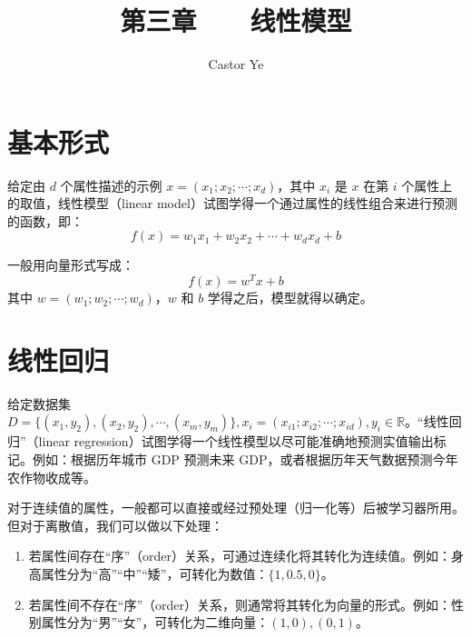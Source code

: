 \documentclass[12pt, a4paper]{article} %
\title{第三章 \ \ \ 线性模型} %
\author{Castor Ye} %
\date{} %
\begin{document}
\maketitle %
\newtheorem{definition}{定义}[section]
\newtheorem{theorem}{定理}[section]
\newtheorem{example}{例}[section]
\newtheorem{solution}{题解}
\newtheorem{algorithm}{算法}
\newtheorem{axiom}{公理}
\newtheorem{property}{性质}
\newtheorem{proposition}{命题}
\newtheorem{lemma}{引理}
\newtheorem{corollary}{推论}[section]
\newtheorem{remark}{注解}
\newtheorem{condition}{条件}
\newtheorem{conclusion}{结论}
\newtheorem{assumption}{假设}
\renewcommand{\figurename}{图} %
\renewcommand{\tablename}{表} %
\section{基本形式}

给定由 $d$ 个属性描述的示例 $x = (x_1; x_2; \cdots; x_d)$，其中 $x_i$ 是 $x$ 在第 $i$ 个属性上的取值，线性模型（linear model）试图学得一个通过属性的线性组合来进行预测的函数，即：
\begin{equation*}
    f(x) = w_1x_1 + w_2x_2 + \cdots + w_dx_d + b
\end{equation*}

一般用向量形式写成：
\begin{equation*}
    f(x) = w^T x + b
\end{equation*}
其中 $w = (w_1; w_2; \cdots ; w_d)$，$w$ 和 $b$ 学得之后，模型就得以确定。

\section{线性回归}

给定数据集 $D = \{(x_1, y_2), (x_2, y_2), \cdots, (x_m, y_m)\}, x_i = (x_{i1}; x_{i2}; \cdots; x_{id}), y_i \in \mathbb{R}$。“线性回归”（linear regression）试图学得一个线性模型以尽可能准确地预测实值输出标记。例如：根据历年城市 GDP 预测未来 GDP，或者根据历年天气数据预测今年农作物收成等。

对于连续值的属性，一般都可以直接或经过预处理（归一化等）后被学习器所用。但对于离散值，我们可以做以下处理：

\begin{enumerate}[\hspace*{2em} i.]
    \item 若属性间存在“序”（order）关系，可通过连续化将其转化为连续值。例如：身高属性分为“高”“中”“矮”，可转化为数值：$\{1, 0.5, 0\}$。
    \item 若属性间不存在“序”（order）关系，则通常将其转化为向量的形式。例如：性别属性分为“男”“女”，可转化为二维向量：${(1, 0), (0, 1)}$。
\end{enumerate}
\end{document}
